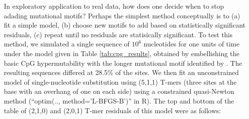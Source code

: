 \documentclass{article}
\newcommand{\nA}{\mbox{A}}  %
\newcommand{\nC}{\mbox{C}}
\newcommand{\nG}{\mbox{G}}
\newcommand{\nT}{\mbox{T}}
\theoremstyle{plain}
\theoremstyle{definition}
\begin{document}
In exploratory application to real data, how does one decide when to stop adading mutational motifs?
Perhaps the simplest method conceptually is to 
(a) fit a simple model,
(b) choose new motifs to add based on statistically significant residuals,
(c) repeat until no residuals are statisically significant.
To test this method,
we simulated a single sequence of $10^6$ nucleotides
for one units of time
under the model given in Table \ref{tab:cpg_results},
obtained by embellishing the basic CpG hypermutability
with the longer mutational motif identified by \citet{harris}.
The resulting sequences differed at 28.5\% of the sites.
We then fit an unconstrained model of single-nucleotide substitution using (5,1,1) T-mers
(three sites at the base with an overhang of one on each side)
using a constrained quasi-Newton method (``optim(.., method='L-BFGS-B')'' in R).
The top and bottom of the table of (2,1,0) and (2,0,1) T-mer residuals of this model were as follows:
\end{document}
